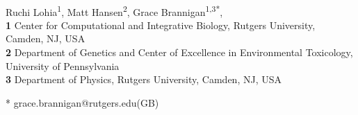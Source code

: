 \documentclass[10pt,letterpaper]{article}
\begin{document}
\vspace*{0.2in}

\begin{flushleft}
{\Large
\textbf{} %
}
\newline
\\
Ruchi Lohia\textsuperscript{1},
Matt Hansen\textsuperscript{2},
Grace Brannigan\textsuperscript{1,3*},
\\
\bigskip
\textbf{1} Center for Computational and Integrative Biology, Rutgers University, Camden, NJ, USA
\\
\textbf{2}  Department of Genetics and Center of Excellence in Environmental Toxicology, University of Pennsylvania 
\\
\textbf{3} Department of Physics, Rutgers University, Camden, NJ, USA
\\
\bigskip

% 
%





* grace.brannigan@rutgers.edu(GB)

\end{flushleft}
\end{document}
